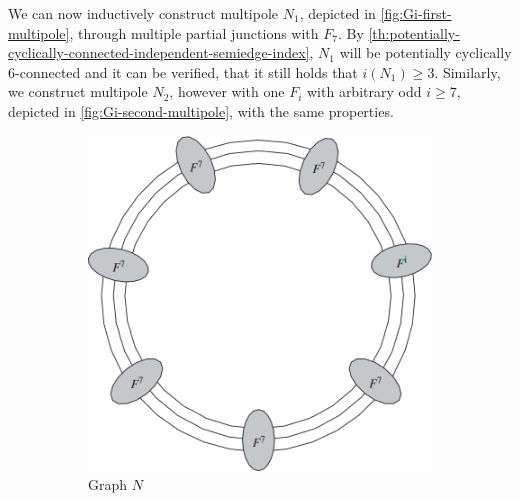 \documentclass[12pt, twoside]{book}
\begin{document}
\begin{example}
	We can now inductively construct multipole $N_1$, depicted in \cref{fig:Gi-first-multipole}, through multiple partial junctions with $F_7$. By \cref{th:potentially-cyclically-connected-independent-semiedge-index}, $N_1$ will be potentially cyclically 6-connected and it can be verified, that it still holds that $i(N_1)\geq 3$. Similarly, we construct multipole $N_2$, however with one $F_i$ with arbitrary odd $i\geq 7$, depicted in \cref{fig:Gi-second-multipole}, with the same properties.
	
	\begin{figure}
		\centering
		\begin{subfigure}[b]{0.45\textwidth}
			\centering
			\includegraphics[width=\textwidth]{images/Gi-before-subdivision}
			\caption{Graph $N$}
			\label{fig:Gi-without-middle-before-subdivisions}
		\end{subfigure}
		\hfill
		\begin{subfigure}[b]{0.45\textwidth}
			\centering

\end{subfigure}
\end{figure}
\end{example}
\end{document}

